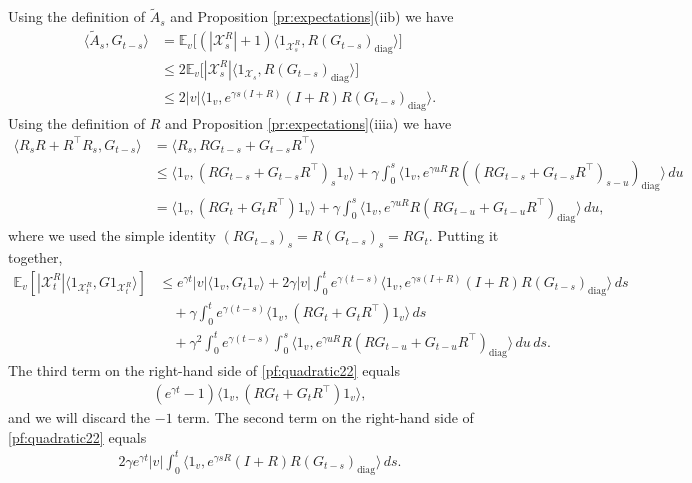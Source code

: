 \documentclass[11pt,reqno]{amsart}
\numberwithin{equation}{section}
\theoremstyle{definition}
\def\E{{\mathbb E}}
\def\X{{\mathcal X}}
\begin{document}
Using the definition of $\widetilde{A}_s$ and Proposition \ref{pr:expectations}(iib) we have
\begin{align*}
\langle \widetilde{A}_s , G_{t-s}\rangle &= \E_v\big[(|\X^{R}_s|+1) \langle 1_{\X^{R}_s}, R (G_{t-s})_{\mathrm{diag}}\rangle\big] \\
& \le  2\E_v\big[|\X^{R}_s| \langle 1_{\X_s}, R (G_{t-s})_{\mathrm{diag}}\rangle\big] \\
	&\le 2 |v|\langle 1_v,e^{\gamma s (I+R)}(I+R)R (G_{t-s})_{\mathrm{diag}}\rangle.
\end{align*}
Using the definition of $R$ and Proposition \ref{pr:expectations}(iiia) we have
\begin{align*}
\langle R_sR + R^\top R_s , G_{t-s}\rangle &= \langle R_s, R G_{t-s} + G_{t-s}R^\top \rangle \\ 
	&\le \langle 1_v, (R G_{t-s} + G_{t-s}R^\top)_s 1_v\rangle  + \gamma \int_0^s \langle 1_v, e^{\gamma uR} R ((R G_{t-s} + G_{t-s}R^\top)_{s-u})_{\mathrm{diag}}\rangle  \,du  \\
	&= \langle 1_v, (R G_t + G_tR^\top)  1_v\rangle  + \gamma \int_0^s \langle 1_v, e^{\gamma uR} R (R G_{t-u} + G_{t-u}R^\top)_{\mathrm{diag}}\rangle  \,du ,
\end{align*}
where we used the simple identity $(R G_{t-s})_s  =  R (G_{t-s})_s = R G_t$.
Putting it together,
\begin{align}
\E_v[  |\X^{R}_t|\langle 1_{\X^{R}_t},G1_{\X^{R}_t}\rangle ] &\le e^{\gamma t}|v| \langle 1_v, G_t1_v\rangle + 2\gamma |v| \int_0^t e^{\gamma (t-s)} \langle 1_v,e^{\gamma s (I+R)}(I+R)R (G_{t-s})_{\mathrm{diag}}\rangle   \,ds \nonumber \\
	&\quad + \gamma \int_0^t e^{\gamma (t-s)}  \langle 1_v, (R G_t + G_tR^\top)  1_v\rangle \,ds \label{pf:quadratic22} \\
	&\quad + \gamma^2\int_0^t e^{\gamma (t-s)} \int_0^s \langle 1_v, e^{\gamma uR} R (R G_{t-u} + G_{t-u}R^\top)_{\mathrm{diag}}\rangle  \,du  \,ds. \nonumber
\end{align}
The third term on the right-hand side of \eqref{pf:quadratic22} equals 
\begin{align*}
(e^{\gamma t}-1) \langle 1_v, (R G_t + G_tR^\top)  1_v\rangle ,
\end{align*}
and we will discard the $-1$ term.
The second term on the right-hand side of  \eqref{pf:quadratic22} equals 
\begin{align*}
2\gamma e^{\gamma t}|v| \int_0^t  \langle 1_v,e^{\gamma s  R }(I+R)R (G_{t-s})_{\mathrm{diag}}\rangle   \,ds.
\end{align*}
\end{document}
